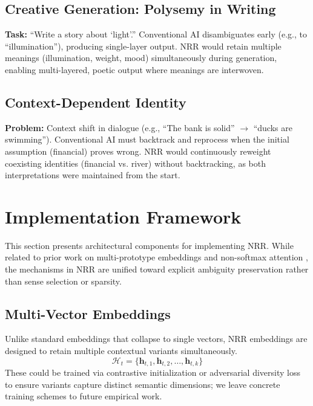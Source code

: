 \documentclass[11pt,a4paper]{article}
\begin{document}
\subsection{Creative Generation: Polysemy in Writing}

\textbf{Task:} ``Write a story about `light'.''
Conventional AI disambiguates early (e.g., to ``illumination''), producing single-layer output.
NRR would retain multiple meanings (illumination, weight, mood) simultaneously during generation, enabling multi-layered, poetic output where meanings are interwoven.

\subsection{Context-Dependent Identity}

\textbf{Problem:} Context shift in dialogue (e.g., ``The bank is solid'' $\to$ ``ducks are swimming'').
Conventional AI must backtrack and reprocess when the initial assumption (financial) proves wrong.
NRR would continuously reweight coexisting identities (financial vs. river) without backtracking, as both interpretations were maintained from the start.

\section{Implementation Framework}
\label{sec:implementation}

This section presents architectural components for implementing NRR.
While related to prior work on multi-prototype embeddings \cite{reisinger2010multi, levine2020sensebert, loureiro2022lmms} and non-softmax attention \cite{katharopoulos2020transformers, choromanski2021rethinking}, the mechanisms in NRR are unified toward explicit ambiguity preservation rather than sense selection or sparsity.

\subsection{Multi-Vector Embeddings}

Unlike standard embeddings that collapse to single vectors, NRR embeddings are designed to retain multiple contextual variants simultaneously.
\begin{equation}
\mathcal{H}_t = \{\mathbf{h}_{t,1}, \mathbf{h}_{t,2}, \ldots, \mathbf{h}_{t,k}\}
\end{equation}
These could be trained via contrastive initialization or adversarial diversity loss to ensure variants capture distinct semantic dimensions; we leave concrete training schemes to future empirical work.
\end{document}
